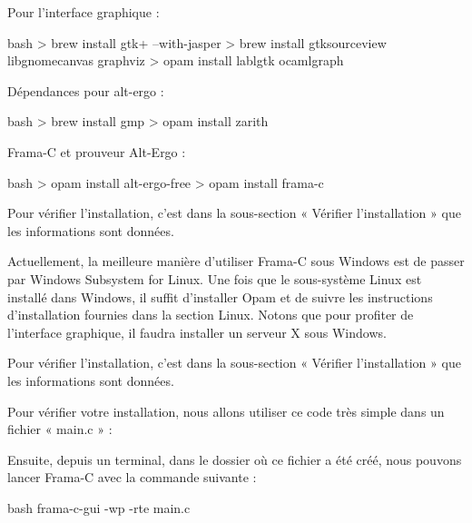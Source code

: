 Pour l'interface graphique :



\begin{CodeBlock}{bash}
> brew install gtk+ --with-jasper
> brew install gtksourceview libgnomecanvas graphviz
> opam install lablgtk ocamlgraph 
\end{CodeBlock}



Dépendances pour alt-ergo :



\begin{CodeBlock}{bash}
> brew install gmp
> opam install zarith
\end{CodeBlock}



Frama-C et prouveur Alt-Ergo :



\begin{CodeBlock}{bash}
> opam install alt-ergo-free
> opam install frama-c
\end{CodeBlock}



Pour vérifier l'installation, c'est dans la sous-section « Vérifier l'installation »
que les informations sont données.





Actuellement, la meilleure manière d'utiliser Frama-C sous Windows
est de passer par Windows Subsystem for Linux. Une fois que le sous-système
Linux est installé dans Windows, il suffit d'installer Opam et de suivre les
instructions d'installation fournies dans la section Linux. Notons que pour
profiter de l'interface graphique, il faudra installer un serveur X sous
Windows.


Pour vérifier l'installation, c'est dans la sous-section « Vérifier l'installation »
que les informations sont données.




Pour vérifier votre installation, nous allons utiliser ce code très simple dans un 
fichier « main.c » :




Ensuite, depuis un terminal, dans le dossier où ce fichier a été créé,
nous pouvons lancer Frama-C avec la commande suivante :



\begin{CodeBlock}{bash}
frama-c-gui -wp -rte main.c
\end{CodeBlock}



